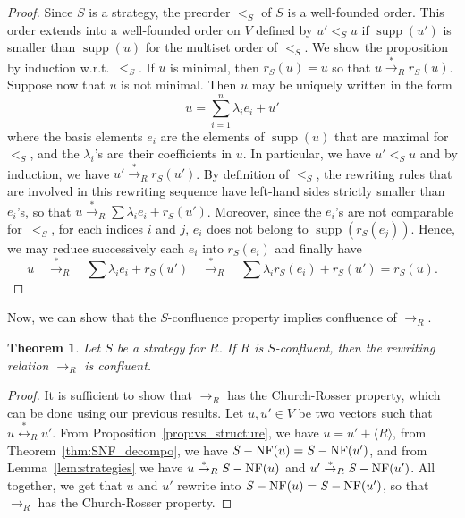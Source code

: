 \documentclass[11pt]{article}
\newtheorem{theorem}{Theorem}[section]
\theoremstyle{definition}
\newcommand\wrt{w.r.t.}
\newcommand\ordS{<_S}
\DeclareMathOperator{\supp}{supp}
\newcommand\Span[1]{\langle #1\rangle}
\newcommand\rewR{\to_R}
\newcommand\transR{\overset{*}{\to}_R}
\newcommand\equivR{\overset{*}{\leftrightarrow}_R}
\DeclareMathOperator{\SNF}{{\it S}-NF}
\begin{document}
\begin{proof}
  Since $S$ is a strategy, the preorder $\ordS$ of $S$ is a
  well-founded order. This order extends into a well-founded order on $V$
  defined by $u'\ordS u$ if $\supp(u')$ is smaller than $\supp(u)$ for
  the multiset order of $\ordS$. We show the proposition by induction
  \wrt\ $\ordS$. If $u$ is minimal, then $r_S(u)=u$ so that
  $u\transR r_S(u)$. Suppose now that $u$ is not minimal. Then $u$ may be
  uniquely written in the form 
  \begin{equation*}\label{equ:decompo_max}
    u=\sum_{i=1}^n\lambda_ie_i+u'
  \end{equation*}
  where the basis elements $e_i$ are the elements of $\supp(u)$ that are
  maximal for~$\ordS$, and the $\lambda_i$'s are their coefficients in
  $u$. In particular, we have $u'<_S u$ and by induction, we have
  $u'\transR r_S(u')$. By definition of $\ordS$, the rewriting rules that
  are involved in this rewriting sequence have left-hand sides strictly
  smaller than $e_i$'s, so that $u\transR\sum\lambda_ie_i+r_S(u')$.
  Moreover, since the $e_i$'s are not comparable for~$\ordS$, for each
  indices $i$ and $j$, $e_i$ does not belong to $\supp(r_S(e_j))$. Hence,
  we may reduce successively each $e_i$ into $r_S(e_i)$ and finally have
  \[
  u \quad\transR\quad
  \sum \lambda_ie_i+r_S(u')\quad\transR\quad
  \sum\lambda_ir_S(e_i) + r_S(u')
  =r_S(u).\]
\end{proof}
\smallskip

Now, we can show that the $S$-confluence property implies confluence of
$\rewR$.
\medskip

\begin{theorem}\label{thm-S-conf}
  Let $S$ be a strategy for $R$. If $R$ is $S$-confluent, then the
  rewriting relation $\rewR$ is confluent.
\end{theorem}

\begin{proof}
  It is sufficient to show that $\rewR$ has the Church-Rosser property,
  which can be done using our previous results. Let $u,u'\in V$ be two
  vectors such that $u\equivR u'$. From
  Proposition~\ref{prop:vs_structure}, we have $u=u'+\Span{R}$, from
  Theorem~\ref{thm:SNF_decompo}, we have $\SNF(u)=\SNF(u')$,
  and from Lemma~\ref{lem:strategies} we have $u\transR\SNF(u)$ and
  $u'\transR\SNF(u')$. All together, we get that $u$ and $u'$ rewrite 
  into $\SNF(u)=\SNF(u')$, so that~$\rewR$ has the Church-Rosser
  property.
\end{proof}
\smallskip
\end{document}
